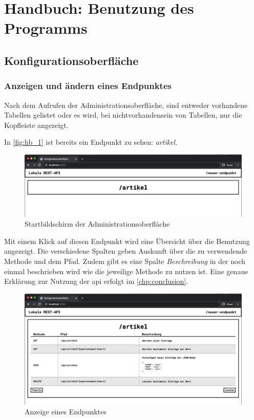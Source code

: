 \chapter{Handbuch: Benutzung des Programms} \label{chp:handbook}


\section{Konfigurationsoberfläche}
\subsection{Anzeigen und ändern eines Endpunktes}
Nach dem Aufrufen der Administrationsoberfläche, sind entweder vorhandene Tabellen gelistet oder es wird, bei nichtvorhandensein von Tabellen, nur die Kopfleiste angezeigt. 

In \autoref{fig:hb_1} ist bereits ein Endpunkt zu sehen: \textit{artikel}. 

\begin{figure}[h]
    \centering
    \includegraphics[width=15cm]{figures/hb_1.png}    %
    \caption{Startbildschirm der Administrationsoberfläche}
    \label{fig:hb_1}
\end{figure}

Mit einem Klick auf diesen Endpunkt wird eine Übersicht über die Benutzung angezeigt. Die verschiedene Spalten geben Auskunft über die zu verwendende Methode und dem Pfad. Zudem gibt es eine Spalte \textit{Beschreibung} in der noch einmal beschrieben wird wie die jeweilige Methode zu nutzen ist. Eine genaue Erklärung zur Nutzung der \gls{api} erfolgt im \autoref{chp:conclusion}.

\begin{figure}[H]
    \centering
    \includegraphics[width=15cm]{figures/hb_2.png}    %
    \caption{Anzeige eines Endpunktes}
    \label{fig:hb_2}
\end{figure}

